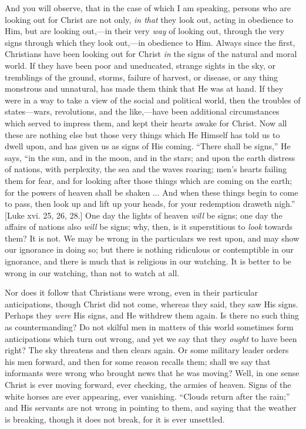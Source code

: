 And you will observe, that in the case of which I am speaking,
persons who are looking out for Christ are not only, \emph{in that}
they look out, acting in obedience to Him, but are looking out,—in
their very \emph{way} of looking out, through the very signs through
which they look out,—in obedience to Him. Always since the first,
Christians have been looking out for Christ \emph{in} the signs of the
natural and moral world. If they have been poor and uneducated,
strange sights in the sky, or tremblings of the ground, storms,
failure of harvest, or disease, or any thing monstrous and unnatural,
has made them think that He was at hand. If they were in a way to take
a view of the social and political world, then the troubles of states—wars,
revolutions, and the like,—have been additional circumstances which
served to impress them, and kept their hearts awake for Christ. Now
all these are nothing else but those very things which He Himself has
told us to dwell upon, and has given us as signs of His coming. ``There
shall be signs,'' He says, ``in the sun, and in the moon, and
in the stars; and upon the earth distress of nations, with perplexity,
the sea and the waves roaring; men's hearts failing them for fear, and
for looking after those things which are coming on the earth; for the
powers of heaven shall be shaken ... And when these things begin to
come to pass, then look up and lift up your heads, for your redemption
draweth nigh.'' [Luke xvi. 25, 26, 28.] One day the lights of
heaven \emph{will} be signs; one day the affairs of nations also \emph{will}
be signs; why, then, is it superstitious to \emph{look} towards them?
It is not. We may be wrong in the particulars we rest upon, and may
show our ignorance in doing so; but there is nothing ridiculous or
contemptible in our ignorance, and there is much that is religious in
our watching. It is better to be wrong in our watching, than not to
watch at all.

Nor does it follow that Christians were wrong, even in their
particular anticipations, though Christ did not come, whereas they
said, they saw His signs. Perhaps they \emph{were} His signs, and He withdrew
them again. Is there no such thing as countermanding? Do not skilful
men in matters of this world sometimes form anticipations which turn
out wrong, and yet we say that they \emph{ought} to have been right?
The sky threatens and then clears again. Or some military leader
orders his men forward, and then for some reason recalls them; shall
we say that informants were wrong who brought news that he was moving?
Well, in one sense Christ is ever moving forward, ever checking, the
armies of heaven. Signs of the white horses are ever appearing, ever
vanishing. ``Clouds return after the rain;'' and His servants
are not wrong in pointing to them, and saying that the weather is
breaking, though it does not break, for it is ever unsettled.

